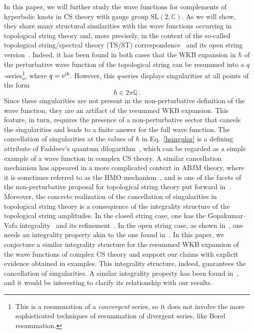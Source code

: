 \documentclass[a4paper,11pt]{article}
\theoremstyle{definition}
\def\IC{{\mathbb C}}
\def\IQ{{\mathbb Q}}
\newcommand{\re}{{\rm e}}
\newcommand{\ri}{{\rm i}}
\newcommand{\be}{\begin{equation}}
\newcommand{\ee}{\end{equation}}
\begin{document}
In this paper, we will further study the wave functions for complements of hyperbolic knots in CS theory with gauge group $\text{SL}(2,\IC)$.
As we will show, they share many structural similarities with the wave functions occurring in topological string theory and, more precisely, in the context of the so-called topological string/spectral theory (TS/ST) correspondence~\cite{ghm,cgm,wzh, mmrev} and its open string version~\cite{mz-wv,mz-wv2,szabolcs,fgrassi}. Indeed, it has been found in both cases that the WKB expansion in $\hbar$ of the perturbative wave function of the topological string can be resummed into a $q$-series\footnote{This is a resummation of a {\it convergent} series, so it does not involve the more sophisticated techniques of resummation of divergent series, like Borel resummation.}, where $q= \re^{\ri \hbar}$. However, this $q$-series displays singularities at all points of the form 
%
\be \label{hsingular}
\hbar \in 2 \pi \IQ \, .
\ee
%
Since these singularities are not present in the non-perturbative definition of the wave function, 
they are an artifact of the resummed WKB expansion. This feature, in turn, requires the presence of a 
non-perturbative sector that cancels the singularities and leads to a finite answer for the full wave function. 
The cancellation of singularities at the values of $\hbar$ in Eq.~\eqref{hsingular} is a defining attribute of Faddeev's quantum dilogarithm~\cite{faddeev}, which can be regarded as a simple example of a wave function in complex CS theory. 
A similar cancellation mechanism has appeared in a more complicated context in ABJM theory, where it is sometimes referred to as the  
HMO mechanism~\cite{hmo2}, and is one of the facets of the non-perturbative proposal for topological string theory put forward in~\cite{ghm,cgm,wzh}. 
%
Moreover, the concrete realization of the cancellation of singularities in topological string theory is a consequence of the integrality structure of the topological string amplitudes. 
In the closed string case, one has the Gopakumar--Vafa integrality~\cite{gv} and its refinement~\cite{hiv}. 
In the open string case, as shown in~\cite{kpamir,mz-wv,szabolcs}, one needs an integrality 
property akin to the one found in~\cite{ov,lmv,nawata}. In this paper, we conjecture a similar integrality structure for 
the resummed WKB expansion of the wave functions of complex CS theory and support our claims with explicit evidence obtained in examples. 
This integrality structure, indeed, guarantees the cancellation of singularities. 
A similar integrality property has been found in~\cite{ekholm}, and it would be interesting to clarify its relationship with our results. 
\end{document}
